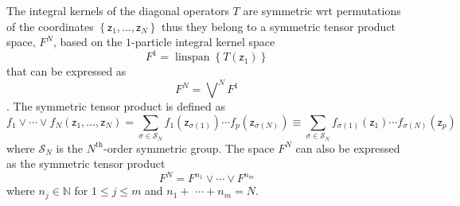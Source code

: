 \documentclass[aps,preprint]{revtex4}%
\begin{document}
The integral kernels of the diagonal operators $T$ are symmetric wrt
permutations of the coordinates $\left\{  \mathsf{z}_{1},\ldots,\mathsf{z}%
_{N}\right\}  $ thus they belong to a symmetric tensor product space, $F^{N}$,
based on the $1$-particle integral kernel space
\begin{equation}
F^{1}=\operatorname{linspan}\left\{  T\left(  \mathsf{z}_{1}\right)  \right\}
\end{equation}
that can be expressed as
\begin{equation}
F^{N}=%
{\displaystyle\bigvee\nolimits^{N}}
F^{1}%
\end{equation}
\cite{Greub,MM}. The symmetric tensor product is defined as
\begin{equation}
f_{1}\vee\cdots\vee f_{N}\left(  \mathsf{z}_{1},\ldots,\mathsf{z}_{N}\right)
=%
{\textstyle\sum\limits_{\sigma\in\mathcal{S}_{N}}}
f_{1}\left(  \mathsf{z}_{\sigma\left(  1\right)  }\right)  \cdots f_{p}\left(
\mathsf{z}_{\sigma\left(  N\right)  }\right)  \equiv%
{\textstyle\sum\limits_{\sigma\in\mathcal{S}_{N}}}
f_{\sigma\left(  1\right)  }\left(  \mathsf{z}_{1}\right)  \cdots
f_{\sigma\left(  N\right)  }\left(  \mathsf{z}_{p}\right)
\end{equation}
where $\mathcal{S}_{N}$ is the $N^{\text{th}}$-order symmetric group. The
space $F^{N}$ can also be expressed as the symmetric tensor product
\begin{equation}
F^{N}=F^{n_{1}}\vee\cdots\vee F^{n_{m}}%
\end{equation}
where $n_{j}\in\mathbb{N}$ for $1\leq j\leq m$ and $n_{1}+$ $\cdots+n_{m}=N$.
\end{document}
